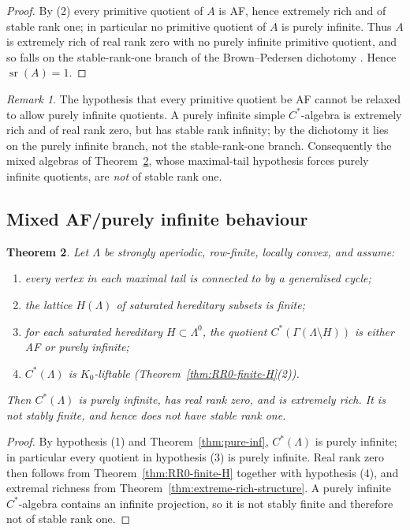 \documentclass[12pt]{amsart}
\theoremstyle{plain}
\newtheorem{theorem}{Theorem}[section]
\theoremstyle{definition}
\theoremstyle{remark}
\newtheorem{remark}[theorem]{Remark}
\begin{document}
\begin{proof}
By (2) every primitive quotient of $A$ is AF, hence extremely rich
\cite{BP} and of stable rank one; in particular no primitive quotient of
$A$ is purely infinite. Thus $A$ is extremely rich of real rank zero with
no purely infinite primitive quotient, and so falls on the stable-rank-one
branch of the Brown--Pedersen dichotomy \cite[Corollary~2.9]{BP3}. Hence
$\operatorname{sr}(A)=1$.
\end{proof}

\begin{remark}
The hypothesis that every primitive quotient be AF cannot be relaxed to
allow purely infinite quotients. A purely infinite simple $C^*$-algebra is
extremely rich \cite{Pe0} and of real rank zero, but has stable rank
infinity; by the dichotomy \cite[Corollary~2.9]{BP3} it lies on the purely
infinite branch, not the stable-rank-one branch. Consequently the
mixed algebras of Theorem~\ref{thm:mixed-extreme}, whose maximal-tail
hypothesis forces purely infinite quotients, are \emph{not} of stable rank
one.
\end{remark}



\subsection{Mixed AF/purely infinite behaviour}

\begin{theorem}\label{thm:mixed-extreme}
Let $\Lambda$ be strongly aperiodic, row-finite, locally convex, and
assume:
\begin{enumerate}
\item every vertex in each maximal tail is connected to by a generalised
      cycle;
\item the lattice $H(\Lambda)$ of saturated hereditary subsets is finite;
\item for each saturated hereditary $H\subset\Lambda^0$, the quotient
      $C^*(\Gamma(\Lambda\setminus H))$ is either AF or purely infinite;
\item $C^*(\Lambda)$ is $K_0$-liftable (Theorem~\ref{thm:RR0-finite-H}(2)).
\end{enumerate}
Then $C^*(\Lambda)$ is purely infinite, has real rank zero, and is extremely
rich. It is not stably finite, and hence does not have stable rank one.
\end{theorem}

\begin{proof}
By hypothesis (1) and Theorem~\ref{thm:pure-inf}, $C^*(\Lambda)$ is purely
infinite; in particular every quotient in hypothesis (3) is purely infinite.
Real rank zero then follows from Theorem~\ref{thm:RR0-finite-H} together with
hypothesis (4), and extremal richness from
Theorem~\ref{thm:extreme-rich-structure}. A purely infinite $C^*$-algebra
contains an infinite projection, so it is not stably finite and therefore not
of stable rank one.
\end{proof}
\end{document}
